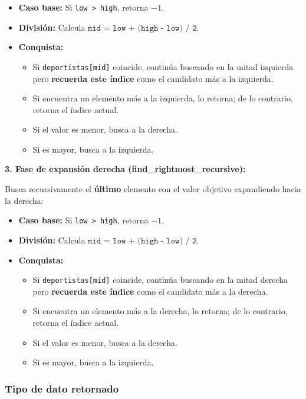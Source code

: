 \begin{itemize}
    \item \textbf{Caso base:} Si \texttt{low > high}, retorna $-1$.
    \item \textbf{División:} Calcula \(\texttt{mid = low + (high - low) / 2}\).
    \item \textbf{Conquista:} 
    \begin{itemize}
        \item Si \texttt{deportistas[mid]} coincide, continúa buscando en la mitad izquierda pero \textbf{recuerda este índice} como el candidato más a la izquierda.
        \item Si encuentra un elemento más a la izquierda, lo retorna; de lo contrario, retorna el índice actual.
        \item Si el valor es menor, busca a la derecha.
        \item Si es mayor, busca a la izquierda.
    \end{itemize}
\end{itemize}

\textbf{3. Fase de expansión derecha (find\_rightmost\_recursive):}

Busca recursivamente el \textbf{último} elemento con el valor objetivo expandiendo hacia la derecha:

\begin{itemize}
    \item \textbf{Caso base:} Si \texttt{low > high}, retorna $-1$.
    \item \textbf{División:} Calcula \(\texttt{mid = low + (high - low) / 2}\).
    \item \textbf{Conquista:} 
    \begin{itemize}
        \item Si \texttt{deportistas[mid]} coincide, continúa buscando en la mitad derecha pero \textbf{recuerda este índice} como el candidato más a la derecha.
        \item Si encuentra un elemento más a la derecha, lo retorna; de lo contrario, retorna el índice actual.
        \item Si el valor es menor, busca a la derecha.
        \item Si es mayor, busca a la izquierda.
    \end{itemize}
\end{itemize}

\subsubsection{Tipo de dato retornado}

